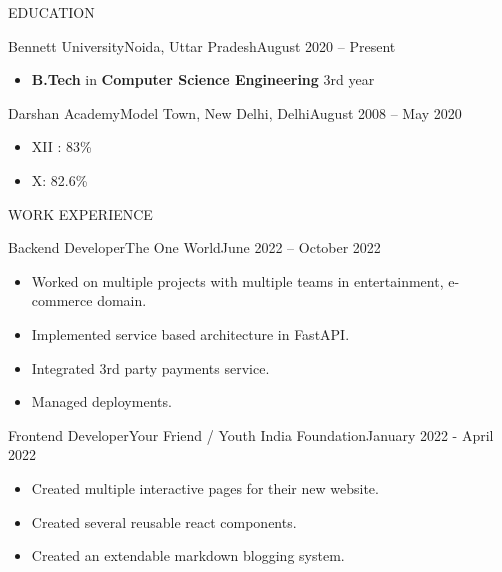 \documentclass[]{mcdowellcv}
\begin{document}
	\makeheader
	

\begin{cvsection}{EDUCATION}
		\begin{cvsubsection}{Bennett University}{Noida, Uttar Pradesh}{August 2020 -- Present}
			\begin{itemize}
				\item {\bf B.Tech} in {\bf Computer Science Engineering} 3rd year
			\end{itemize}
		\end{cvsubsection}
            \begin{cvsubsection}{Darshan Academy}{Model Town, New Delhi, Delhi}{August 2008 -- May 2020}
			\begin{itemize}
				\item XII : 83\%
                    \item X: 82.6\%
			\end{itemize}
		\end{cvsubsection}
	\end{cvsection}

	\begin{cvsection}{WORK EXPERIENCE}
		\begin{cvsubsection}{Backend Developer}{The One World}{June 2022 – October 2022}
			\begin{itemize}
            \item Worked on multiple projects with multiple teams in entertainment, e-commerce domain.
            \item Implemented service based architecture in FastAPI.
            \item Integrated 3rd party payments service.
            \item Managed deployments.
			\end{itemize}
		\end{cvsubsection}
		
		\begin{cvsubsection}{Frontend Developer}{Your Friend / Youth India Foundation}{January 2022 - April 2022}	
			\begin{itemize}
            	\item Created multiple interactive pages for their new website.
            	\item Created several reusable react components. 
            	\item Created an extendable markdown blogging system.
			\end{itemize}
		\end{cvsubsection}

	\end{cvsection}
\end{document}
